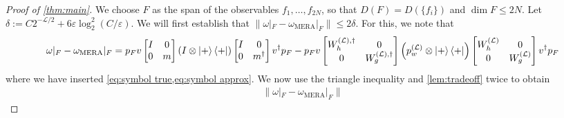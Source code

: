 \documentclass[aps,pra,reprint,superscriptaddress,floatfix,amsmath,amssymb,amsfonts]{revtex4-1}
\newcommand*{\ot}{\otimes}
\begin{document}
\begin{proof}[Proof of \cref{thm:main}]
We choose $F$ as the span of the observables $f_1,\dots,f_{2N}$, so that $D(F)=D(\{f_i\})$ and $\dim F\leq 2N$.
Let $\delta := C 2^{-\mathcal L/2} + 6 \varepsilon \log_2^2(C/\varepsilon)$.
We will first establish that $\lVert \omega|_F - \omega_{\text{MERA}}|_F \rVert \leq 2 \delta$.
For this, we note that
\begin{align*}
\omega|_F - \omega_{\text{MERA}}|_F
= p_F v \begin{bmatrix}I & 0\\0 & m\end{bmatrix} \left( I \ot \ket+\bra+ \right) \begin{bmatrix}I & 0\\0 & m^\dagger\end{bmatrix} v^\dagger p_F
- p_F v \begin{bmatrix}W_h^{(\mathcal L),\dagger} & 0\\0 & W_g^{(\mathcal L),\dagger}\end{bmatrix} \left( p_w^{(\mathcal L)} \ot \ket+\bra+ \right) \begin{bmatrix}W_h^{(\mathcal L)} & 0\\0 & W_g^{(\mathcal L)}\end{bmatrix} v^\dagger p_F
\end{align*}
where we have inserted \cref{eq:symbol true,eq:symbol approx}.
We now use the triangle inequality and \cref{lem:tradeoff} twice to obtain
\begin{equation}\label{eq:single-particle bound}
\begin{aligned}
\lVert \omega|_F - \omega_{\text{MERA}}|_F \rVert

\end{aligned}
\end{equation}
\end{proof}
\end{document}

